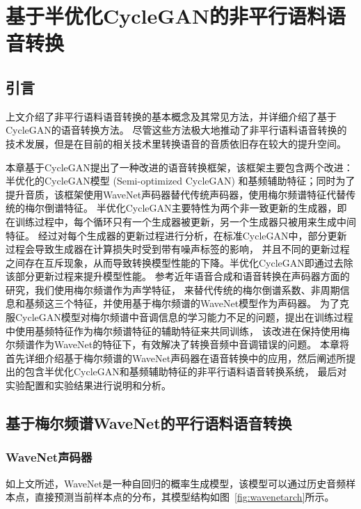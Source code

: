 \chapter{基于半优化CycleGAN的非平行语料语音转换}

\section{引言}
上文介绍了非平行语料语音转换的基本概念及其常见方法，并详细介绍了基于CycleGAN的语音转换方法。
尽管这些方法极大地推动了非平行语料语音转换的技术发展，但是在目前的相关技术里转换语音的音质依旧存在较大的提升空间。

本章基于CycleGAN提出了一种改进的语音转换框架，该框架主要包含两个改进：半优化的CycleGAN模型 (Semi-optimized CycleGAN) 
和基频辅助特征；同时为了提升音质，该框架使用WaveNet声码器替代传统声码器，使用梅尔频谱特征代替传统的梅尔倒谱特征。
半优化CycleGAN主要特性为两个非一致更新的生成器，即在训练过程中，每个循环只有一个生成器被更新，另一个生成器只被用来生成中间特征。
经过对每个生成器的更新过程进行分析，在标准CycleGAN中，部分更新过程会导致生成器在计算损失时受到带有噪声标签的影响，
并且不同的更新过程之间存在互斥现象，从而导致转换模型性能的下降。半优化CycleGAN即通过去除该部分更新过程来提升模型性能。
参考近年语音合成和语音转换在声码器方面的研究，我们使用梅尔频谱作为声学特征，
来替代传统的梅尔倒谱系数、非周期信息和基频这三个特征，并使用基于梅尔频谱的WaveNet模型作为声码器。
为了克服CycleGAN模型对梅尔频谱中音调信息的学习能力不足的问题，提出在训练过程中使用基频特征作为梅尔频谱特征的辅助特征来共同训练，
该改进在保持使用梅尔频谱作为WaveNet的特征下，有效解决了转换音频中音调错误的问题。
本章将首先详细介绍基于梅尔频谱的WaveNet声码器在语音转换中的应用，然后阐述所提出的包含半优化CycleGAN和基频辅助特征的非平行语料语音转换系统，
最后对实验配置和实验结果进行说明和分析。

\section{基于梅尔频谱WaveNet的平行语料语音转换}
\subsection{WaveNet声码器}
如上文所述，WaveNet是一种自回归的概率生成模型，该模型可以通过历史音频样本点，直接预测当前样本点的分布，其模型结构如图~\ref{fig:wavenetarch}所示。

